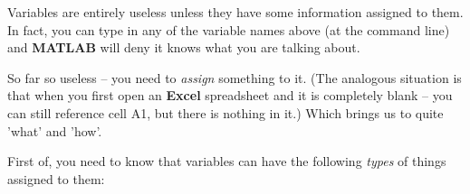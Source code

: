 \documentclass{tufte-book} %
\begin{document}
Variables are entirely useless unless they have some information assigned to them. In fact, you can type in any of the variable names above (at the command line) and \textbf{MATLAB} will deny it knows what you are talking about.

So far so useless -- you need to \textit{assign} something to it. (The analogous situation is that when you first open an \textbf{Excel} spreadsheet and it is completely blank -- you can still reference cell A1, but there is nothing in it.) Which brings us to quite 'what' and 'how'.

First of, you need to know that variables can have the following \textit{types} of things assigned to them:
\end{document}
